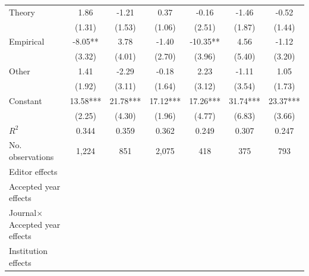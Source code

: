 \begin{table}
\begin{threeparttable}
\begin{tabular}{p{3.78cm}S@{}S@{}S@{}S@{}S@{}S@{}}
            Theory                        &        1.86   &       -1.21   &        0.37   &       -0.16   &       -1.46   &       -0.52   \\
                                          &      (1.31)   &      (1.53)   &      (1.06)   &      (2.51)   &      (1.87)   &      (1.44)   \\
            Empirical                     &       -8.05** &        3.78   &       -1.40   &      -10.35** &        4.56   &       -1.12   \\
                                          &      (3.32)   &      (4.01)   &      (2.70)   &      (3.96)   &      (5.40)   &      (3.20)   \\
            Other                         &        1.41   &       -2.29   &       -0.18   &        2.23   &       -1.11   &        1.05   \\
                                          &      (1.92)   &      (3.11)   &      (1.64)   &      (3.12)   &      (3.54)   &      (1.73)   \\
            Constant                      &       13.58***&       21.78***&       17.12***&       17.26***&       31.74***&       23.37***\\
                                          &      (2.25)   &      (4.30)   &      (1.96)   &      (4.77)   &      (6.83)   &      (3.66)   \\
            \midrule
            \(R^2\)                       &       0.344   &       0.359   &       0.362   &       0.249   &       0.307   &       0.247   \\
            No. observations              &       1,224   &         851   &       2,075   &         418   &         375   &         793   \\
            \midrule
            Editor effects        &           {}   &           {}   &           {}   &           {}   &           {}   &           {}   \\
            Accepted year effects         &           {}   &           {}   &               &           {}   &           {}   &               \\
            Journal\(\times\)Accepted year effects &               &               &           {}   &               &               &           {}   \\
            Institution effects           &           {}   &           {}   &           {}   &           {}   &           {}   &           {}   \\

\end{tabular}
\end{threeparttable}
\end{table}
